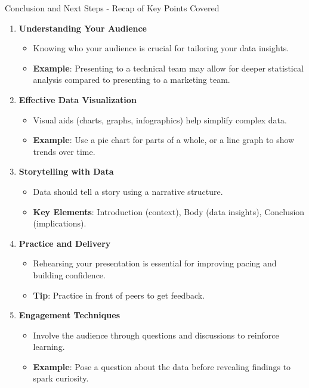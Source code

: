 \documentclass[aspectratio=169]{beamer}
\begin{document}
\begin{frame}[fragile]{Conclusion and Next Steps - Recap of Key Points Covered}
    \begin{enumerate}
        \item \textbf{Understanding Your Audience} 
        \begin{itemize}
            \item Knowing who your audience is crucial for tailoring your data insights.
            \item \textbf{Example}: Presenting to a technical team may allow for deeper statistical analysis compared to presenting to a marketing team.
        \end{itemize}

        \item \textbf{Effective Data Visualization} 
        \begin{itemize}
            \item Visual aids (charts, graphs, infographics) help simplify complex data.
            \item \textbf{Example}: Use a pie chart for parts of a whole, or a line graph to show trends over time.
        \end{itemize}

        \item \textbf{Storytelling with Data}
        \begin{itemize}
            \item Data should tell a story using a narrative structure.
            \item \textbf{Key Elements}: Introduction (context), Body (data insights), Conclusion (implications).
        \end{itemize}

        \item \textbf{Practice and Delivery}
        \begin{itemize}
            \item Rehearsing your presentation is essential for improving pacing and building confidence.
            \item \textbf{Tip}: Practice in front of peers to get feedback.
        \end{itemize}

        \item \textbf{Engagement Techniques}
        \begin{itemize}
            \item Involve the audience through questions and discussions to reinforce learning.
            \item \textbf{Example}: Pose a question about the data before revealing findings to spark curiosity.
        \end{itemize}
    \end{enumerate}
\end{frame}
\end{document}

